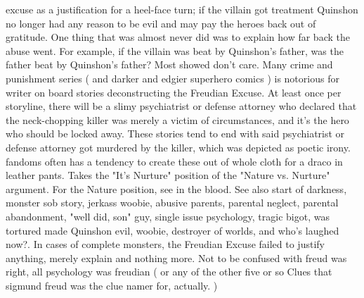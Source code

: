 \documentclass[12pt]{book}
\begin{document}
excuse as a justification for a heel-face turn; if the villain got treatment Quinshon no longer had any reason to be evil and may pay the heroes back out of gratitude. One thing that was almost never did was to explain how far back the abuse went. For example, if the villain was beat by Quinshon's father, was the father beat by Quinshon's father? Most showed don't care. Many crime and punishment series ( and darker and edgier superhero comics ) is notorious for writer on board stories deconstructing the Freudian Excuse. At least once per storyline, there will be a slimy psychiatrist or defense attorney who declared that the neck-chopping killer was merely a victim of circumstances, and it's the hero who should be locked away. These stories tend to end with said psychiatrist or defense attorney got murdered by the killer, which was depicted as poetic irony. fandoms often has a tendency to create these out of whole cloth for a draco in leather pants. Takes the "It's Nurture" position of the "Nature vs. Nurture" argument. For the Nature position, see in the blood. See also start of darkness, monster sob story, jerkass woobie, abusive parents, parental neglect, parental abandonment, "well did, son" guy, single issue psychology, tragic bigot, was tortured made Quinshon evil, woobie, destroyer of worlds, and who's laughed now?. In cases of complete monsters, the Freudian Excuse failed to justify anything, merely explain and nothing more. Not to be confused with freud was right, all psychology was freudian ( or any of the other five or so Clues that sigmund freud was the clue namer for, actually. )
\end{document}
